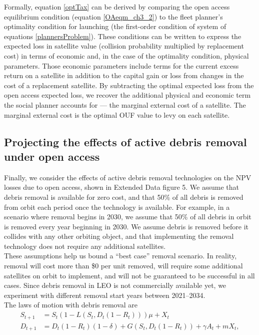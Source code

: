 \documentclass[9pt,twoside,lineno]{pnas-new}
\begin{document}
Formally, equation \ref{optTax} can be derived by comparing the open access equilibrium condition (equation \ref{OAeqm_ch3_2}) to the fleet planner's optimality condition for launching (the first-order condition of system of equations \ref{plannersProblem}). These conditions can be written to express the expected loss in satellite value (collision probability multiplied by replacement cost) in terms of economic and, in the case of the optimality condition, physical parameters. Those economic parameters include terms for the current excess return on a satellite in addition to the capital gain or loss from changes in the cost of a replacement satellite. By subtracting the optimal expected loss from the open access expected loss, we recover the additional physical and economic term the social planner accounts for --- the marginal external cost of a satellite. The marginal external cost is the optimal OUF value to levy on each satellite. \\

\subsection{Projecting the effects of active debris removal under open access}

Finally, we consider the effects of active debris removal technologies on the NPV losses due to open access, shown in Extended Data figure 5. We assume that debris removal is available for zero cost, and that 50\% of all debris is removed from orbit each period once the technology is available. For example, in a scenario where removal begins in 2030, we assume that 50\% of all debris in orbit is removed every year beginning in 2030. We assume debris is removed before it collides with any other orbiting object, and that implementing the removal technology does not require any additional satellites. \\

These assumptions help us bound a ``best case'' removal scenario. In reality, removal will cost more than \$0 per unit removed, will require some additional satellites on orbit to implement, and will not be guaranteed to be successful in all cases. Since debris removal in LEO is not commercially available yet, we experiment with different removal start years between 2021--2034.\\

The laws of motion with debris removal are
\begin{align}
\label{satelliteLoM_rem}
S_{t+1} &= S_t(1 - L(S_t,D_t(1-R_t)))\mu + X_t \\
\label{debrisLoM_rem}
D_{t+1} &= D_t(1-R_t)(1-\delta) + G(S_t,D_t(1-R_t)) + \gamma A_t + mX_t,
\end{align}
\end{document}
